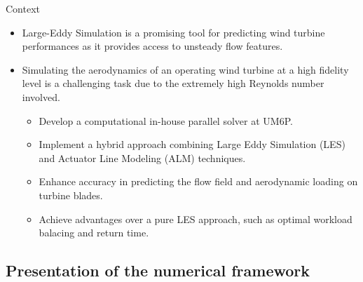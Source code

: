 \documentclass[10pt]{beamer}
\begin{document}
\begin{frame}{Context}
\begin{block}{}
\begin{itemize}
\justifying

\bigskip
\item[\ding{113}] Large-Eddy Simulation is a promising tool for predicting wind turbine performances as it provides access to unsteady flow features.
\item[\ding{113}] Simulating the aerodynamics of an operating wind turbine at a high fidelity level is a challenging task due to the extremely high Reynolds number involved.
\begin{itemize}
\justifying
\item Develop a computational in-house parallel solver at UM6P.
\item Implement a hybrid approach combining Large Eddy Simulation (LES) and Actuator Line Modeling (ALM) techniques.
\item Enhance accuracy in predicting the flow field and aerodynamic loading on turbine blades.
\item Achieve advantages over a pure LES approach, such as optimal workload balacing and return time. 
\end{itemize}

\end{itemize}
\end{block}

\end{frame}

\subsection{Presentation of the numerical framework}
\end{document}
